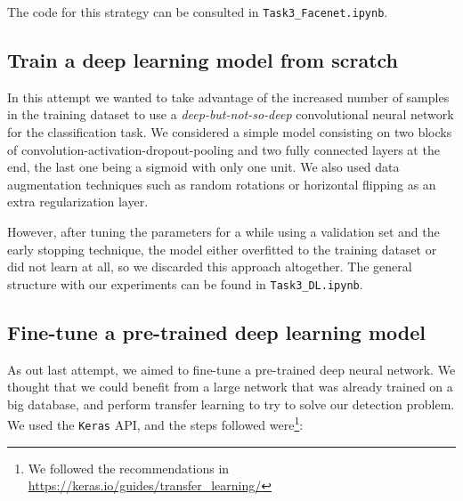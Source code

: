 \documentclass[11pt]{article}
\begin{document}
The code for this strategy can be consulted in \texttt{Task3\_Facenet.ipynb}.

\subsection*{Train a deep learning model from scratch}

In this attempt we wanted to take advantage of the increased number of samples in the training dataset to use a \emph{deep-but-not-so-deep} convolutional neural network for the classification task. We considered a simple model consisting on  two blocks of convolution-activation-dropout-pooling and two fully connected layers at the end, the last one being a sigmoid with only one unit. We also used data augmentation techniques such as random rotations or horizontal flipping as an extra regularization layer.

However, after tuning the parameters for a while using a validation set and the early stopping technique, the model either overfitted to the training dataset or did not learn at all, so we discarded this approach altogether. The general structure with our experiments can be found in \texttt{Task3\_DL.ipynb}.

\subsection*{Fine-tune a pre-trained deep learning model}

As out last attempt, we aimed to fine-tune a pre-trained deep neural network. We thought that we could benefit from a large network that was already trained on a big database, and perform transfer learning to try to solve our detection problem. We used the \texttt{Keras} API, and the steps followed were\footnote{We followed the recommendations in \url{https://keras.io/guides/transfer_learning/}}:
\end{document}
